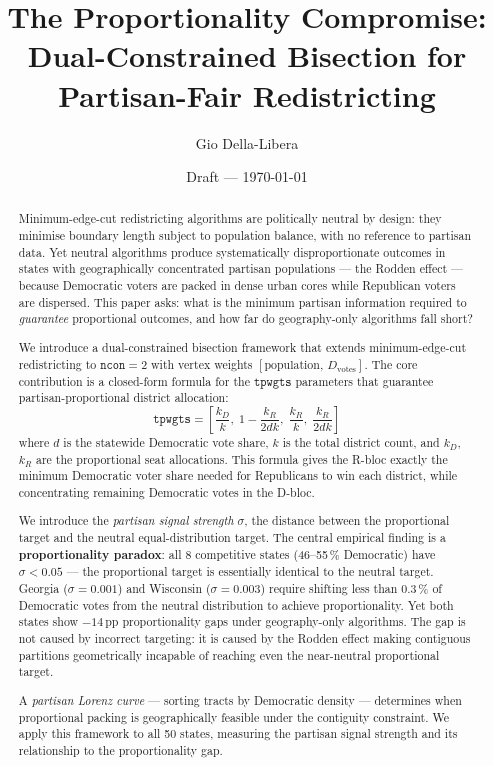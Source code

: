 \documentclass[12pt]{article}
\title{The Proportionality Compromise:\\
Dual-Constrained Bisection for Partisan-Fair Redistricting}
\author{Gio Della-Libera}
\date{Draft --- \today}
\begin{document}
\maketitle

\begin{abstract}
Minimum-edge-cut redistricting algorithms are politically neutral by design:
they minimise boundary length subject to population balance, with no reference
to partisan data.
Yet neutral algorithms produce systematically disproportionate outcomes in
states with geographically concentrated partisan populations --- the Rodden
effect --- because Democratic voters are packed in dense urban cores while
Republican voters are dispersed.
This paper asks: what is the minimum partisan information required to
\emph{guarantee} proportional outcomes, and how far do geography-only
algorithms fall short?

We introduce a dual-constrained bisection framework that extends minimum-edge-cut
redistricting to $\mathtt{ncon}=2$ with vertex weights
$[\text{population},\, D_{\text{votes}}]$.
The core contribution is a closed-form formula for the $\mathtt{tpwgts}$
parameters that guarantee partisan-proportional district allocation:
\[
  \mathtt{tpwgts} = \left[\frac{k_D}{k},\; 1 - \frac{k_R}{2dk},\;
                          \frac{k_R}{k},\; \frac{k_R}{2dk}\right]
\]
where $d$ is the statewide Democratic vote share, $k$ is the total district
count, and $k_D$, $k_R$ are the proportional seat allocations.
This formula gives the R-bloc exactly the minimum Democratic voter share
needed for Republicans to win each district, while concentrating remaining
Democratic votes in the D-bloc.

We introduce the \emph{partisan signal strength} $\sigma$, the distance between
the proportional target and the neutral equal-distribution target.
The central empirical finding is a \textbf{proportionality paradox}: all 8
competitive states (46--55\,\% Democratic) have $\sigma < 0.05$ --- the
proportional target is essentially identical to the neutral target.
Georgia ($\sigma = 0.001$) and Wisconsin ($\sigma = 0.003$) require shifting
less than 0.3\,\% of Democratic votes from the neutral distribution to achieve
proportionality.
Yet both states show $-14$\,pp proportionality gaps under geography-only algorithms.
The gap is not caused by incorrect targeting: it is caused by the Rodden effect
making contiguous partitions geometrically incapable of reaching even the
near-neutral proportional target.

A \emph{partisan Lorenz curve} --- sorting tracts by Democratic density ---
determines when proportional packing is geographically feasible under the
contiguity constraint.
We apply this framework to all 50 states, measuring the partisan signal strength
and its relationship to the proportionality gap.


\end{abstract}
\end{document}
